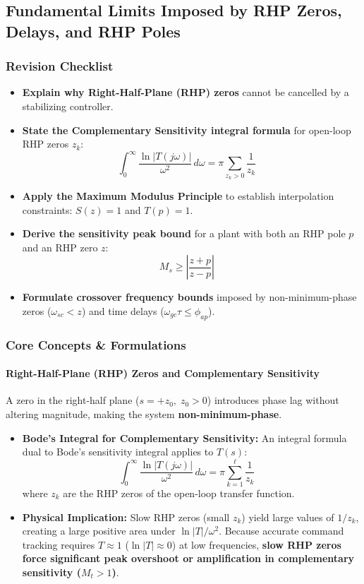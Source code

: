 \documentclass[12pt,onecolumn,twoside ]{article}
\begin{document}
	\subsection{Fundamental Limits Imposed by RHP Zeros, Delays, and RHP Poles}
	\subsubsection{Revision Checklist}
	\begin{itemize}
		\item[$\square$]
		\textbf{Explain why Right-Half-Plane (RHP) zeros} cannot be cancelled by a stabilizing controller.
		\item[$\square$]
		\textbf{State the Complementary Sensitivity integral formula} for open-loop RHP zeros $z_k$: \[
		\int_{0}^{\infty} \frac{\ln |T(j\omega)|}{\omega^2}\, d\omega = \pi \sum_{z_k > 0} \frac{1}{z_k} \quad
		\]
		\item[$\square$]
		\textbf{Apply the Maximum Modulus Principle} to establish interpolation constraints: $S(z) = 1$ and $T(p) = 1$.
		\item[$\square$]
		\textbf{Derive the sensitivity peak bound} for a plant with both an RHP pole $p$ and an RHP zero $z$: \[
		M_s \ge \left| \frac{z + p}{z - p} \right| \quad
		\]
		\item[$\square$]
		\textbf{Formulate crossover frequency bounds} imposed by non-minimum-phase zeros ($\omega_{sc} < z$) and time delays ($\omega_{gc} \tau \le \phi_{ap}$).
	\end{itemize}
	
	\subsubsection{Core Concepts \& Formulations}
	\paragraph{Right-Half-Plane (RHP) Zeros and Complementary Sensitivity}
	A zero in the right-half plane ($s = +z_0,\; z_0 > 0$) introduces phase lag without altering magnitude, making the system \textbf{non-minimum-phase}.
	\begin{itemize}
		\item
		\textbf{Bode’s Integral for Complementary Sensitivity:} An integral formula dual to Bode's sensitivity integral applies to $T(s)$: \[
		\int_{0}^{\infty} \frac{\ln |T(j\omega)|}{\omega^2}\, d\omega = \pi \sum_{k=1}^{\ell} \frac{1}{z_k} \quad
		\] where $z_k$ are the RHP zeros of the open-loop transfer function.
		\item
		\textbf{Physical Implication:} Slow RHP zeros (small $z_k$) yield large values of $1/z_k$, creating a large positive area under $\ln |T|/\omega^2$. Because accurate command tracking requires $T \approx 1$ ($\ln |T| \approx 0$) at low frequencies, \textbf{slow RHP zeros force significant peak overshoot or amplification in complementary sensitivity ($M_t > 1$)}.
	\end{itemize}
\end{document}
